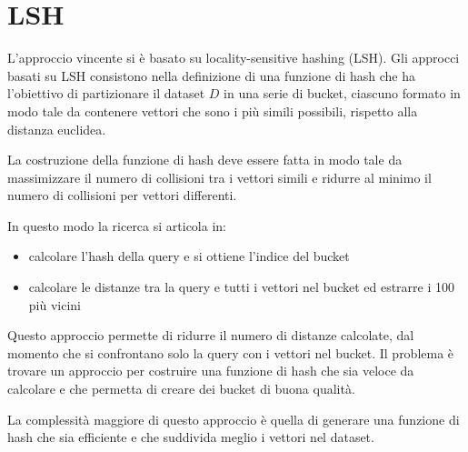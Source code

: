 \chapter{LSH}
L'approccio vincente si è basato su locality-sensitive hashing (LSH).
Gli approcci basati su LSH consistono nella definizione di una funzione di hash 
che ha l'obiettivo di partizionare il dataset $D$ in una serie di bucket, ciascuno 
formato in modo tale da contenere vettori che sono i più simili possibili, rispetto 
alla distanza euclidea. 

La costruzione della funzione di hash deve essere fatta in modo tale da 
massimizzare il numero di collisioni tra i vettori simili e ridurre al minimo 
il numero di collisioni per vettori differenti. 

In questo modo la ricerca si articola in:
\begin{itemize}
    \item calcolare l'hash della query e si ottiene l'indice del bucket
    \item calcolare le distanze tra la query e tutti i vettori nel bucket ed 
    estrarre i 100 più vicini
\end{itemize} 

Questo approccio permette di ridurre il numero di distanze calcolate, dal momento 
che si confrontano solo la query con i vettori nel bucket. Il problema è trovare 
un approccio per costruire una funzione di hash che sia veloce da calcolare e 
che permetta di creare dei bucket di buona qualità.

La complessità maggiore di questo approccio è quella di generare una funzione di 
hash che sia efficiente e che suddivida meglio i vettori nel dataset.